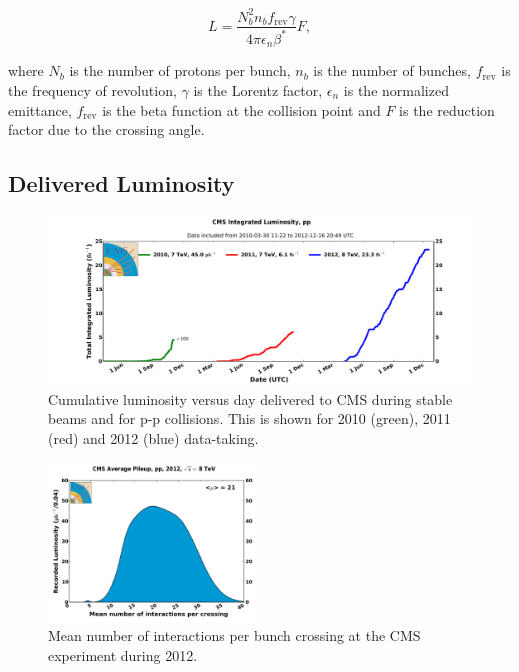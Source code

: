 \begin{equation}
L=\frac{N_{b}^{2}n_{b}f_{\text{rev}}\gamma}{4\pi\epsilon_{n}\beta^{*}}F,
\end{equation}

where $N_{b}$ is the number of protons per bunch, $n_{b}$ is the number of bunches, $f_{\text{rev}}$ is the frequency of revolution, $\gamma$ is the Lorentz factor, $\epsilon_{n}$ is the normalized emittance, $f_{\text{rev}}$ is the beta function at the collision point and $F$ is the reduction factor due to the crossing angle.

\subsection{Delivered Luminosity}

\begin{figure}[!htb]
  \centering
  \includegraphics[width=1.00\textwidth]{Chapter02/CMS/Images/CMS_IntegratedLumi_pp_2010-2012}
  \caption{Cumulative luminosity versus day delivered to CMS during stable beams and for p-p collisions. This is shown for 2010 (green), 2011 (red) and 2012 (blue) data-taking.}
  \label{FIGURE:ExperimentalApparatus_CMS_IntegratedLumi_pp_2010-2012}
\end{figure}

\begin{figure}[!htb]
  \centering
  \includegraphics[width=0.50\textwidth]{Chapter02/CMS/Images/CMS_PileIp_pp_2012}
  \caption{Mean number of interactions per bunch crossing at the CMS experiment during 2012.}
  \label{FIGURE:ExperimentalApparatus_CMS_PileIp_pp_2012}
\end{figure}

